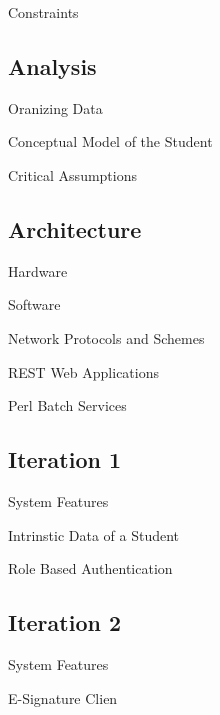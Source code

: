\documentclass{beamer}
\begin{document}
\begin{frame}{Constraints}
\end{frame}

\subsection{Analysis}
\begin{frame}{Oranizing Data}
\end{frame}
\begin{frame}{Conceptual Model of the Student}
\end{frame}
\begin{frame}{Critical Assumptions}
\end{frame}

\subsection{Architecture}
\begin{frame}{Hardware}
\end{frame}
\begin{frame}{Software}
\end{frame}
\begin{frame}{Network Protocols and Schemes}
\end{frame}
\begin{frame}{ REST Web Applications}
\end{frame}
\begin{frame}{Perl Batch Services}
\end{frame}

\subsection{Iteration 1}
\begin{frame}{System Features}
\end{frame}
\begin{frame}{Intrinstic Data of a Student}
\end{frame}
\begin{frame}{Role Based Authentication}
\end{frame}

\subsection{Iteration 2}
\begin{frame}{System Features}
\end{frame}
\begin{frame}{E-Signature Clien}
\end{frame}
\end{document}
